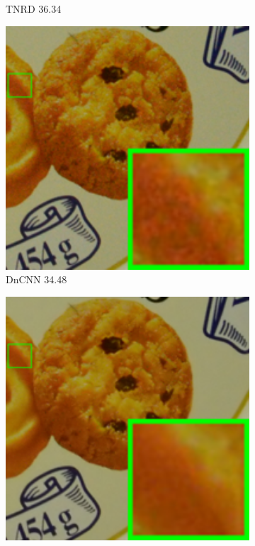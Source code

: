 \begin{figure}
\begin{subfigure}[t]{0.19\textwidth}
\caption{TNRD 36.34}
    \end{subfigure}
    \hfill
    \begin{subfigure}[t]{0.19\textwidth}
        \centering
        \includegraphics[width=1\textwidth]{images/twsc/cc/resize_br_DnCNN_d600_iso3200_2_real.png}
\caption{DnCNN 34.48}
    \end{subfigure}
\hfill
    \begin{subfigure}[t]{0.19\textwidth}
        \centering
        \includegraphics[width=1\textwidth]{images/twsc/cc/resize_br_NI_d600_iso3200_2_real.png}

\end{subfigure}
\end{figure}
